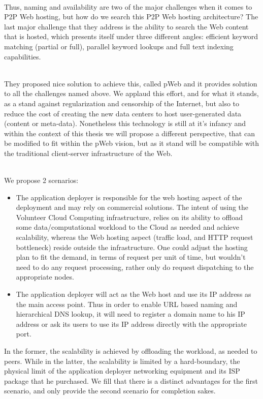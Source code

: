 \documentclass[11pt]{amsart}
\begin{document}
\begin{enumarate}
          \\ Thus, naming and availability are two of the major challenges when it comes
          to P2P Web hosting, but how do we search this P2P Web hosting architecture? The
          last major challenge that they address is the ability to search the Web content
          that is hosted, which presents itself under three different angles: efficient
          keyword matching (partial or full), parallel keyword lookups and full text
          indexing capabilities.
          
          \\ They proposed nice solution to achieve this, called pWeb and it provides
          solution to all the challenges named above. We applaud this effort, and for what
          it stands, as a stand against regularization and censorship of the Internet, but
          also to reduce the cost of creating the new data centers to host user-generated
          data (content or meta-data). Nonetheless this technology is still at it's
          infancy and within the context of this thesis we will propose a different
          perspective, that can be modified to fit within the pWeb vision, but as it stand
          will be compatible with the traditional client-server infrastructure of the Web.

          \\ We propose 2 scenarios:
          \begin{itemize}
            \item The application deployer is responsible for the web hosting aspect of
              the deployment and may rely on commercial solutions. The intent of using the
              Volunteer Cloud Computing infrastructure, relies on its ability to offload
              some data/computational workload to the Cloud as needed and achieve
              scalability, whereas the Web hosting aspect (traffic load, and HTTP request
              bottleneck) reside outside the infrastructure. One could adjust the hosting
              plan to fit the demand, in terms of request per unit of time, but wouldn't
              need to do any request processing, rather only do request dispatching to the
              appropriate nodes.
            \item The application deployer will act as the Web host and use its IP address
              as the main access point. Thus in order to enable URL based naming and
              hierarchical DNS lookup, it will need to register a domain name to his IP
              address or ask its users to use its IP address directly with the appropriate
              port.
          \end{itemize}
          In the former, the scalability is achieved by offloading the workload, as needed
          to peers. While in the latter, the scalability is limited by a hard-boundary,
          the physical limit of the application deployer networking equipment and its ISP
          package that he purchased. We fill that there is a distinct advantages for the
          first scenario, and only provide the second scenario for completion sakes. 


\end{enumarate}
\end{document}
